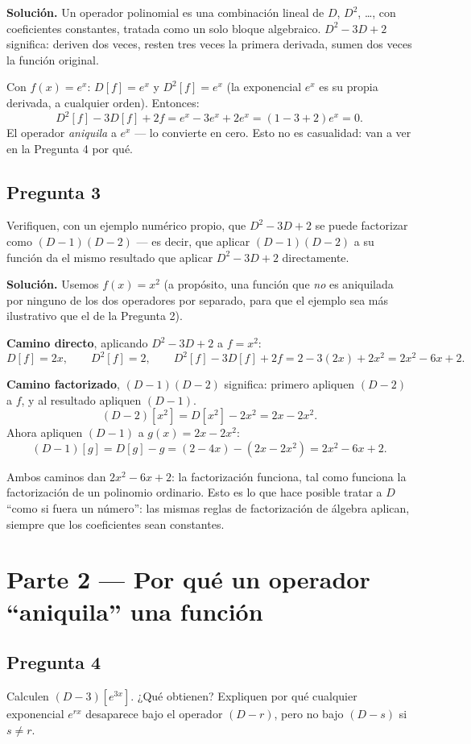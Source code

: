 \documentclass[11pt]{article}
\begin{document}
\noindent\textbf{Solución.} Un operador polinomial es una combinación lineal de $D$, $D^2$, \dots, con coeficientes constantes, tratada como un solo bloque algebraico. $D^2-3D+2$ significa: deriven dos veces, resten tres veces la primera derivada, sumen dos veces la función original.

Con $f(x)=e^x$: $D[f]=e^x$ y $D^2[f]=e^x$ (la exponencial $e^x$ es su propia derivada, a cualquier orden). Entonces:
\[
D^2[f]-3D[f]+2f = e^x - 3e^x + 2e^x = (1-3+2)e^x = 0.
\]
El operador \emph{aniquila} a $e^x$ — lo convierte en cero. Esto no es casualidad: van a ver en la Pregunta 4 por qué.

\subsection*{Pregunta 3}
\begin{pregunta}
Verifiquen, con un ejemplo numérico propio, que $D^2-3D+2$ se puede factorizar como $(D-1)(D-2)$ — es decir, que aplicar $(D-1)(D-2)$ a su función da el mismo resultado que aplicar $D^2-3D+2$ directamente.
\end{pregunta}

\noindent\textbf{Solución.} Usemos $f(x)=x^2$ (a propósito, una función que \emph{no} es aniquilada por ninguno de los dos operadores por separado, para que el ejemplo sea más ilustrativo que el de la Pregunta 2).

\textbf{Camino directo}, aplicando $D^2-3D+2$ a $f=x^2$:
\[
D[f]=2x, \qquad D^2[f]=2, \qquad D^2[f]-3D[f]+2f = 2 - 3(2x) + 2x^2 = 2x^2-6x+2.
\]

\textbf{Camino factorizado}, $(D-1)(D-2)$ significa: primero apliquen $(D-2)$ a $f$, y al resultado apliquen $(D-1)$.
\[
(D-2)[x^2] = D[x^2] - 2x^2 = 2x-2x^2.
\]
Ahora apliquen $(D-1)$ a $g(x)=2x-2x^2$:
\[
(D-1)[g] = D[g]-g = (2-4x)-(2x-2x^2) = 2x^2-6x+2.
\]

Ambos caminos dan $2x^2-6x+2$: la factorización funciona, tal como funciona la factorización de un polinomio ordinario. Esto es lo que hace posible tratar a $D$ ``como si fuera un número'': las mismas reglas de factorización de álgebra aplican, siempre que los coeficientes sean constantes.

\section*{Parte 2 — Por qué un operador ``aniquila'' una función}

\subsection*{Pregunta 4}
\begin{pregunta}
Calculen $(D-3)[e^{3x}]$. ¿Qué obtienen? Expliquen por qué cualquier exponencial $e^{rx}$ desaparece bajo el operador $(D-r)$, pero no bajo $(D-s)$ si $s\neq r$.
\end{pregunta}
\end{document}
